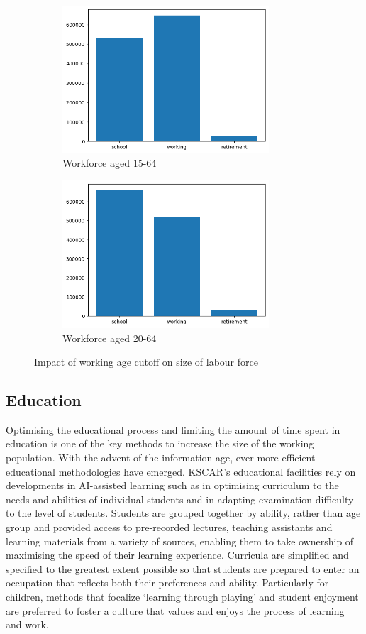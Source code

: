 \documentclass[fleqn,10pt]{Stylesheet} %
\begin{document}
\begin{figure}[t!]
    \begin{subfigure}[t]{0.45\textwidth}
        \centering
        \includegraphics[height=55mm]{fig_demo_down.png}
        \caption{Workforce aged 15-64}
    \end{subfigure}
    \qquad \qquad  %
    \begin{subfigure}[t]{0.45\textwidth}
        \centering
        \includegraphics[height=55mm]{fig_demo.png}
        \caption{Workforce aged 20-64}
    \end{subfigure}%
\caption{Impact of working age cutoff on size of labour force}
\label{fig:workingage}
\end{figure}

\subsection{Education}
Optimising the educational process and limiting the amount of time spent in education is one of the key methods to increase the size of the working population. With the advent of the information age, ever more efficient educational methodologies have emerged. KSCAR's educational facilities rely on developments in AI-assisted learning such as in optimising curriculum to the needs and abilities of individual students and in adapting examination difficulty to the level of students. Students are grouped together by ability, rather than age group and provided access to pre-recorded lectures, teaching assistants and learning materials from a variety of sources, enabling them to take ownership of maximising the speed of their learning experience. Curricula are simplified and specified to the greatest extent possible so that students are prepared to enter an occupation that reflects both their preferences and ability. Particularly for children, methods that focalize ‘learning through playing’ and student enjoyment are preferred to foster a culture that values and enjoys the process of learning and work.
\end{document}
